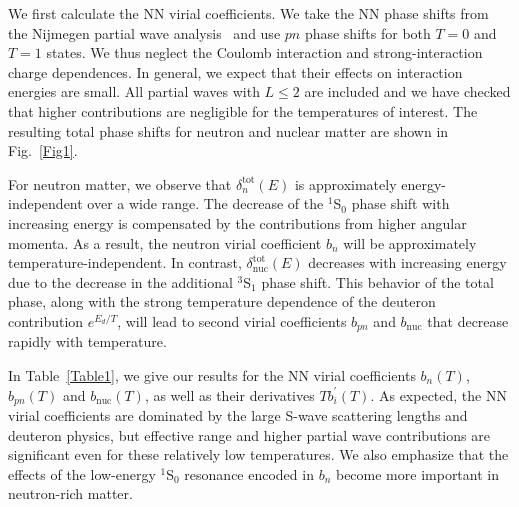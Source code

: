 \documentclass[aps,prc,twocolumn,showpacs,showkeys,amsmath,amssymb]{revtex4}
\begin{document}
We first calculate the NN virial coefficients. We take the NN phase 
shifts from the Nijmegen partial wave analysis~\cite{nnphases} and use 
$pn$ phase shifts for both $T=0$ and $T=1$ states. We thus neglect
the Coulomb interaction and strong-interaction charge dependences. 
In general, we expect that their effects on interaction energies
are small. All partial waves with $L \leqslant 2$ are included and 
we have checked that higher contributions are negligible for the 
temperatures of interest. The resulting total phase shifts for neutron 
and nuclear matter are shown in Fig.~\ref{Fig1}.

For neutron matter, we observe that $\delta^{\text{tot}}_n(E)$ is 
approximately energy-independent over a wide range.  The decrease 
of the $^1$S$_0$ phase shift with increasing energy is compensated 
by the contributions from higher angular momenta. As a result, 
the neutron virial coefficient $b_n$ will be approximately 
temperature-independent.  In contrast, $\delta^{\text{tot}}_{\text{nuc}}(E)$ 
decreases with increasing energy due to the decrease in the 
additional $^3$S$_1$ phase shift.  This behavior of the total phase, 
along with the strong temperature dependence of the deuteron 
contribution $e^{E_d/T}$, will lead to second virial coefficients
$b_{pn}$ and $b_{\text{nuc}}$ that decrease rapidly with temperature.

In Table~\ref{Table1}, we give our results for the NN virial 
coefficients $b_n(T)$, $b_{pn}(T)$ and $b_{\text{nuc}}(T)$, as
well as their derivatives $T b_i^\prime(T)$.
As expected, the NN virial coefficients are dominated by the
large S-wave scattering lengths and deuteron physics, but
effective range and higher partial wave contributions are
significant even for these relatively low temperatures. We also
emphasize that the effects of the low-energy $^1$S$_0$ resonance
encoded in $b_n$ become more important in neutron-rich matter.
\end{document}
